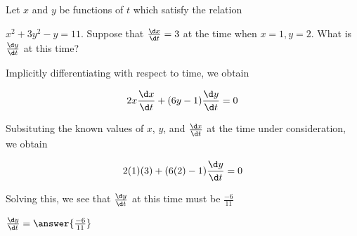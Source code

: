 \documentclass{ximera}
\author{Steven Gubkin}
\begin{document}
\begin{exercise}



Let $x$ and $y$ be functions of $t$ which satisfy the relation

$x^2+3y^2-y = 11$.  Suppose that $\frac{\d x}{\d t} = 3 $ at the time when $x = 1, y=2$.  What is $\frac{\d y}{\d t}$ at this time?

\begin{hint}
	Implicitly differentiating with respect to time, we obtain

\[
 2x\frac{\d x}{\d t} +(6y-1) \frac{\d y}{\d t} = 0
\]
\end{hint}

\begin{hint}
 Subsituting the known values of $x$, $y$, and $\frac{\d x}{\d t}$ at the time under consideration, we obtain

\[
2(1)(3)+(6(2)-1) \frac{\d y}{\d t} = 0
\] 
\end{hint}

\begin{hint}
	Solving this, we see that $\frac{\d y}{\d t}$ at this time must be $\frac{-6}{11}$
\end{hint}

\begin{prompt}
	$\frac{\d y}{\d t} = \answer{\frac{-6}{11}}$
\end{prompt}

\end{exercise}
\end{document}

